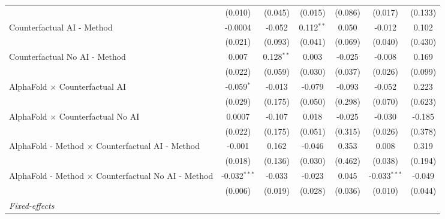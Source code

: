 \begin{tabular}{lcccccc}
                                                              & (0.010)        & (0.045)       & (0.015)      & (0.086)     & (0.017)        & (0.133)\\   
   Counterfactual AI - Method                                 & -0.0004        & -0.052        & 0.112$^{**}$ & 0.050       & -0.012         & 0.102\\   
                                                              & (0.021)        & (0.093)       & (0.041)      & (0.069)     & (0.040)        & (0.430)\\   
   Counterfactual No AI - Method                              & 0.007          & 0.128$^{**}$  & 0.003        & -0.025      & -0.008         & 0.169\\   
                                                              & (0.022)        & (0.059)       & (0.030)      & (0.037)     & (0.026)        & (0.099)\\   
   AlphaFold $\times$ Counterfactual AI                       & -0.059$^{*}$   & -0.013        & -0.079       & -0.093      & -0.052         & 0.223\\   
                                                              & (0.029)        & (0.175)       & (0.050)      & (0.298)     & (0.070)        & (0.623)\\   
   AlphaFold $\times$ Counterfactual No AI                    & 0.0007         & -0.107        & 0.018        & -0.025      & -0.030         & -0.185\\   
                                                              & (0.022)        & (0.175)       & (0.051)      & (0.315)     & (0.026)        & (0.378)\\   
   AlphaFold - Method $\times$ Counterfactual AI - Method     & -0.001         & 0.162         & -0.046       & 0.353       & 0.008          & 0.319\\   
                                                              & (0.018)        & (0.136)       & (0.030)      & (0.462)     & (0.038)        & (0.194)\\   
   AlphaFold - Method $\times$ Counterfactual No AI - Method  & -0.032$^{***}$ & -0.033        & -0.023       & 0.045       & -0.033$^{***}$ & -0.049\\   
                                                              & (0.006)        & (0.019)       & (0.028)      & (0.036)     & (0.010)        & (0.044)\\   
   \midrule
   \emph{Fixed-effects}\\

\end{tabular}
